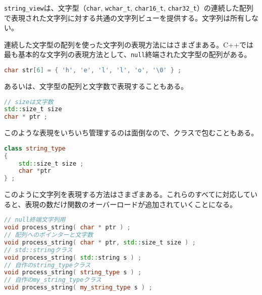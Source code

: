 %

\lstinline!string_view!は、文字型（\lstinline!char!,
\lstinline!wchar_t!, \lstinline!char16_t!,
\lstinline!char32_t!）の連続した配列で表現された文字列に対する共通の文字列ビューを提供する。文字列は所有しない。

%

連続した文字型の配列を使った文字列の表現方法にはさまざまある。C++では最も基本的な文字列の表現方法として、\lstinline!null!終端された文字型の配列がある。

\begin{lstlisting}[language=C++]
char str[6] = { 'h', 'e', 'l', 'l', 'o', '\0' } ;
\end{lstlisting}

あるいは、文字型の配列と文字数で表現することもある。

\begin{lstlisting}[language=C++]
// sizeは文字数
std::size_t size
char * ptr ;
\end{lstlisting}

このような表現をいちいち管理するのは面倒なので、クラスで包むこともある。

\begin{lstlisting}[language=C++]
class string_type
{
    std::size_t size ;
    char *ptr
} ;
\end{lstlisting}

このように文字列を表現する方法はさまざまある。これらのすべてに対応していると、表現の数だけ関数のオーバーロードが追加されていくことになる。

\begin{lstlisting}[language=C++]
// null終端文字列用
void process_string( char * ptr ) ;
// 配列へのポインターと文字数
void process_string( char * ptr, std::size_t size ) ;
// std::stringクラス
void process_string( std::string s ) ;
// 自作のstring_typeクラス
void process_string( string_type s ) ;
// 自作のmy_string_typeクラス
void process_string( my_string_type s ) ;
\end{lstlisting}

